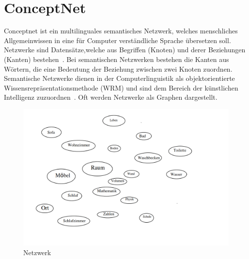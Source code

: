 \section{ConceptNet}
\label{sec:cn}

Conceptnet ist ein multilinguales semantisches Netzwerk, welches menschliches Allgemeinwissen in eine für Computer verständliche Sprache übersetzen soll. Netzwerke sind Datensätze,welche aus Begriffen (Knoten) und derer Beziehungen (Kanten) bestehen~\cite{sowa1987semantic}. Bei semantischen Netzwerken bestehen die Kanten aus Wörtern, die eine Bedeutung der Beziehung zwischen zwei Knoten zuordnen. Semantische Netzwerke dienen in der Computerlinguistik als objektorientierte Wissensrepräsentationsmethode (WRM) und sind dem Bereich der künstlichen Intelligenz zuzuordnen~\cite{helbig2013semantische}. 
Oft werden Netzwerke als Graphen dargestellt. 

\begin{figure}[h]

	\begin{center}
	
	\includegraphics[width=18cm]{images/Netzwerk.png}
	
	\caption{Netzwerk}
	
	\label{netzwerk_Bild}
	
	\end{center}
	
	
\end{figure}

